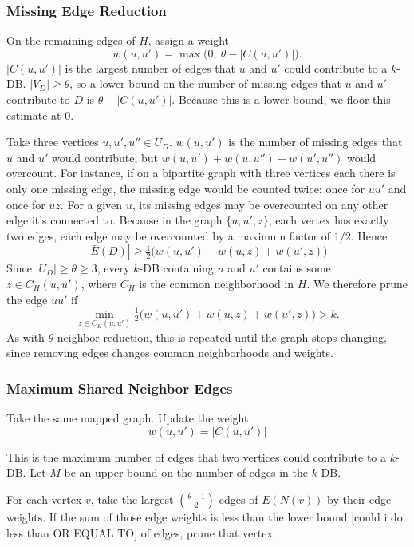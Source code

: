 \documentclass[conference]{IEEEtran}
\begin{document}
\subsubsection{Missing Edge Reduction}
\label{sec:missing-edge-reduction}

On the remaining edges of $H$, assign a weight
\[
w(u, u') = \max\bigl(0,\ \theta - |C(u, u')|\bigr).
\]
$|C(u, u')|$ is the largest number of edges that $u$ and $u'$ could contribute to a $k$-DB. $|V_D| \geq \theta$, so a lower bound on the number of missing edges that $u$ and $u'$ contribute to $D$ is $\theta - |C(u, u')|$. Because this is a lower bound, we floor this estimate at 0.

Take three vertices $u, u', u'' \in U_D$. $w(u, u')$ is the number of missing edges that $u$ and $u'$ would contribute, but $w(u, u') + w(u, u'') + w(u', u'')$ would overcount. For instance, if on a bipartite graph with three vertices each there is only one missing edge, the missing edge would be counted twice: once for $uu'$ and once for $uz$. For a given $u$, its missing edges may be overcounted on any other edge it's connected to. Because in the graph $\{u, u', z\}$, each vertex has exactly two edges, each edge may be overcounted by a maximum factor of $1/2$. Hence
\[
|\bar{E}(D)| \ge \tfrac{1}{2}\bigl(w(u, u') + w(u, z) + w(u', z)\bigr)
\]
Since $|U_D| \ge \theta \ge 3$, every $k$-DB containing $u$ and $u'$ contains some $z \in C_H(u, u')$, where $C_H$ is the common neighborhood in $H$. We therefore prune the edge $uu'$ if
\[
\min_{z \in C_H(u, u')} \tfrac{1}{2}\bigl(w(u, u') + w(u, z) + w(u', z)\bigr) > k.
\]
As with $\theta$ neighbor reduction, this is repeated until the graph stops changing, since removing edges changes common neighborhoods and weights.

\subsubsection{Maximum Shared Neighbor Edges}

Take the same mapped graph. Update the weight \[w(u, u') = |C(u, u')|\]

This is the maximum number of edges that two vertices could contribute to a $k$-DB. Let $M$ be an upper bound on the number of edges in the $k$-DB.

For each vertex $v$, take the largest $\binom{\theta - 1}{2}$ edges of $E(N(v))$ by their edge weights. If the sum of those edge weights is less than the lower bound [could i do less than OR EQUAL TO] of edges, prune that vertex.
\end{document}

